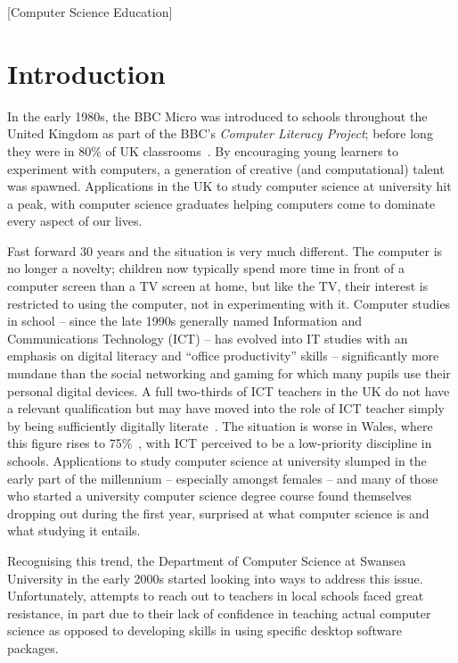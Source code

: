 \documentclass{sig-alternate}
\begin{document}
[Computer Science Education]


\section{Introduction}\label{intro}

In the early 1980s, the BBC Micro was introduced to schools throughout
the United Kingdom as part of the BBC's \emph{Computer Literacy Project}; before
long they were in 80\% of UK classrooms~\cite{vasko:1986}. By
encouraging young learners to experiment with computers, a generation
of creative (and computational) talent was spawned. Applications in
the UK to study computer science at university hit a peak, with
computer science graduates helping computers come to dominate every
aspect of our lives.

Fast forward 30 years and the situation is very much different. The
computer is no longer a novelty; children now typically spend more
time in front of a computer screen than a TV screen at home, but like
the TV, their interest is restricted to using the computer, not in
experimenting with it. Computer studies in school -- since the late
1990s generally named Information and Communications Technology (ICT)
-- has evolved into IT studies with an emphasis on digital literacy
and ``office productivity'' skills -- significantly more mundane than
the social networking and gaming for which many pupils use their
personal digital devices. A full two-thirds of ICT teachers in the UK
do not have a relevant qualification but may have moved into the role
of ICT teacher simply by being sufficiently digitally
literate~\cite{RoyalSoc:2012}.  The situation is worse in Wales, where
this figure rises to 75\%~\cite{GTCW:2008}, with ICT perceived to be a
low-priority discipline in schools. Applications to study computer
science at university slumped in the early part of the millennium --
especially amongst females -- and many of those who started a
university computer science degree course found themselves dropping
out during the first year, surprised at what computer science is and
what studying it entails.

Recognising this trend, the Department of Computer Science at Swansea
University in the early 2000s started looking into ways to address
this issue.  Unfortunately, attempts to reach out to teachers in local
schools faced great resistance, in part due to their lack of
confidence in teaching actual computer science as opposed to
developing skills in using specific desktop software packages.
\end{document}
